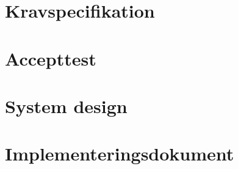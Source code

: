 


	


	


\newpage

\startcontents[overall]
\newpage




\part{Kravspecifikation} \label{part:ks}
\stopcontents[overall]
\startcontents[ks]

\stopcontents[ks]
\resumecontents[overall]
\newpage

\part{Accepttest} \label{part:at}
\stopcontents[overall]
\startcontents[at]

\stopcontents[at]
\resumecontents[overall]
\newpage

\part{ System design} \label{part:sd}
\stopcontents[overall]
\startcontents[sd]

\stopcontents[sd]
\resumecontents[overall]
\newpage

\part{ Implementeringsdokument} \label{part:id}
\stopcontents[overall]
\startcontents[id]

\stopcontents[id]
\resumecontents[overall]


\begingroup
\raggedright
\endgroup



\newpage														%
\listoffixmes													%






\stopcontents[overall]